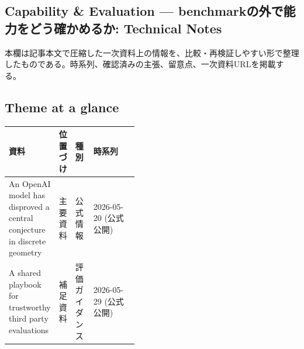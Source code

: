 \subsection*{Capability \& Evaluation — benchmarkの外で能力をどう確かめるか: Technical Notes}
本欄は記事本文で圧縮した一次資料上の情報を、比較・再検証しやすい形で整理したものである。時系列、確認済みの主張、留意点、一次資料URLを掲載する。
\medskip
\subsection*{Theme at a glance}
\begin{center}
\footnotesize
\begin{tabularx}{\linewidth}{@{}p{0.20\linewidth}p{0.10\linewidth}p{0.14\linewidth}X@{}}
\toprule
資料 & 位置づけ & 種別 & 時系列 \\
\midrule
An OpenAI model has disproved a central conjecture in discrete geometry & 主要資料 & 公式情報 & 2026-05-20 (公式公開) \\
A shared playbook for trustworthy third party evaluations & 補足資料 & 評価ガイダンス & 2026-05-29 (公式公開) \\
\bottomrule
\end{tabularx}
\end{center}
\normalsize


